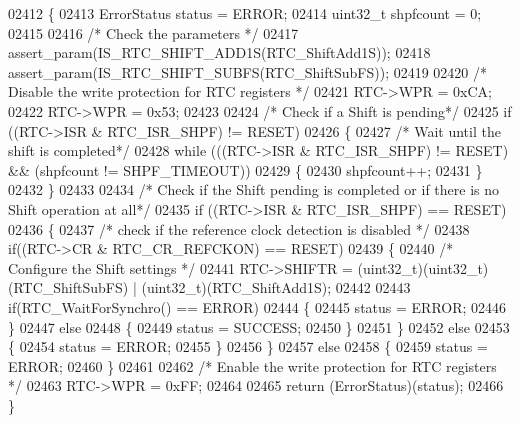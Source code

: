 \begin{DoxyCode}
02412 \{
02413   ErrorStatus status = ERROR;
02414   uint32\_t shpfcount = 0;
02415 
02416   \textcolor{comment}{/* Check the parameters */}
02417   assert_param(IS_RTC_SHIFT_ADD1S(RTC\_ShiftAdd1S));
02418   assert_param(IS_RTC_SHIFT_SUBFS(RTC\_ShiftSubFS));
02419 
02420   \textcolor{comment}{/* Disable the write protection for RTC registers */}
02421   RTC->WPR = 0xCA;
02422   RTC->WPR = 0x53;
02423   
02424   \textcolor{comment}{/* Check if a Shift is pending*/}
02425   \textcolor{keywordflow}{if} ((RTC->ISR & RTC_ISR_SHPF) != RESET)
02426   \{
02427     \textcolor{comment}{/* Wait until the shift is completed*/}
02428     \textcolor{keywordflow}{while} (((RTC->ISR & RTC_ISR_SHPF) != RESET) && (shpfcount != SHPF_TIMEOUT))
02429     \{
02430       shpfcount++;
02431     \}
02432   \}
02433 
02434   \textcolor{comment}{/* Check if the Shift pending is completed or if there is no Shift operation at all*/}
02435   \textcolor{keywordflow}{if} ((RTC->ISR & RTC_ISR_SHPF) == RESET)
02436   \{
02437     \textcolor{comment}{/* check if the reference clock detection is disabled */}
02438     \textcolor{keywordflow}{if}((RTC->CR & RTC_CR_REFCKON) == RESET)
02439     \{
02440       \textcolor{comment}{/* Configure the Shift settings */}
02441       RTC->SHIFTR = (uint32\_t)(uint32\_t)(RTC\_ShiftSubFS) | (uint32\_t)(RTC\_ShiftAdd1S);
02442     
02443       \textcolor{keywordflow}{if}(RTC_WaitForSynchro() == ERROR)
02444       \{
02445         status = ERROR;
02446       \}
02447       \textcolor{keywordflow}{else}
02448       \{
02449         status = SUCCESS;
02450       \}
02451     \}
02452     \textcolor{keywordflow}{else}
02453     \{
02454       status = ERROR;
02455     \}
02456   \}
02457   \textcolor{keywordflow}{else}
02458   \{
02459     status = ERROR;
02460   \}
02461 
02462   \textcolor{comment}{/* Enable the write protection for RTC registers */}
02463   RTC->WPR = 0xFF;
02464   
02465   \textcolor{keywordflow}{return} (ErrorStatus)(status);
02466 \}
\end{DoxyCode}
